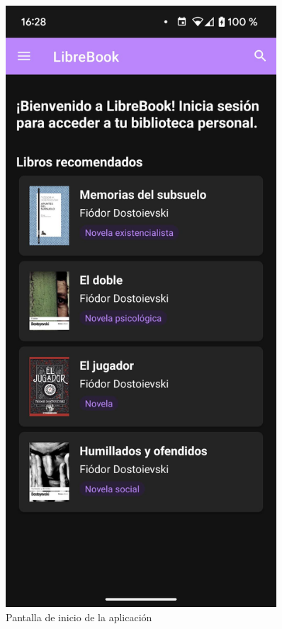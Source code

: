 \documentclass[a4paper,12pt]{report}
\begin{document}
      \begin{minipage}{0.27\textwidth}
        \begin{figure}[H]
          \centering
          \includegraphics[width=0.9\textwidth]{.img/inicio.png}
          \caption{Pantalla de inicio de la aplicación}
          \label{fig:pantalla-inicio}
        \end{figure}
      \end{minipage}
\end{document}
